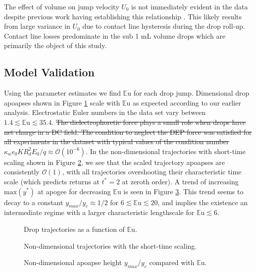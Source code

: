 \documentclass[aip,reprint, floatfix]{revtex4-1}
\begin{document}
The effect of volume on jump velocity $U_0$ is not immediately evident in the data despite previous work having establishing this relationship \cite{attari_puddle_2016}. This likely results from large variance in $U_0$ due to contact line hysteresis during the drop roll-up. Contact line losses predominate in the sub 1 mL volume drops which are primarily the object of this study.  

\subsection{Model Validation}
Using the parameter estimates we find $\mathbb{E}\mbox{u}$ for each drop jump. Dimensional drop apoapses shown in Figure \ref{fig:series_s_eu} scale with $\mathbb{E}\mbox{u}$ as expected according to our earlier analysis. Electrostatic Euler numbers in the data set vary between $1.4 \lesssim \mathbb{E}\mbox{u} \lesssim 35.4$. \sout{The dielectrophoretic force plays a small role when drops have net charge in a DC field. The condition to neglect the DEP force was satisfied for all experiments in the dataset with typical values of the condition number $\kappa_w \epsilon_0 K R_d^2 E_0/q \approx \mathcal{O}(10^{-6})$}. In the non-dimensional trajectories with short-time scaling shown in Figure \ref{fig:series_s_ds}, we see that the scaled trajectory apoapses are consistently $\mathcal{O}(1)$, with all trajectories overshooting their characteristic time scale (which predicts returns at $t^*  =2$ at zeroth order). A trend of increasing $\mbox{max} \left(y^* \right)$ at apogee for decreasing $\mathbb{E}\mbox{u}$ is seen in Figure \ref{fig:yscale_trend}. This trend seems to decay to a constant $y_{max}/y_c \approx 1/2$ for $6 \lesssim \mathbb{E}\mbox{u} \lesssim 20$, and implies the existence an intermediate regime with a larger characteristic lengthscale for $\mathbb{E}\mbox{u} \lesssim 6$.
\begin{figure}[!htb]
    \centering
    \resizebox{0.5\textwidth}{!}{}
    \caption{Drop trajectories as a function of $\mathbb{E}\mbox{u}$.\label{fig:series_s_eu}}
\end{figure}
\begin{figure}[htb]
    \centering
    \resizebox{0.5\textwidth}{!}{}
    \caption{Non-dimensional trajectories with the short-time scaling.\label{fig:series_s_ds}}
\end{figure}
\begin{figure}[htb]
    \centering
    \resizebox{0.5\textwidth}{!}{}
    \caption{Non-dimensional apoapse height $y_{max}/y_c$ compared with $\mathbb{E}\mbox{u}$.\label{fig:yscale_trend}}
\end{figure}
\end{document}
